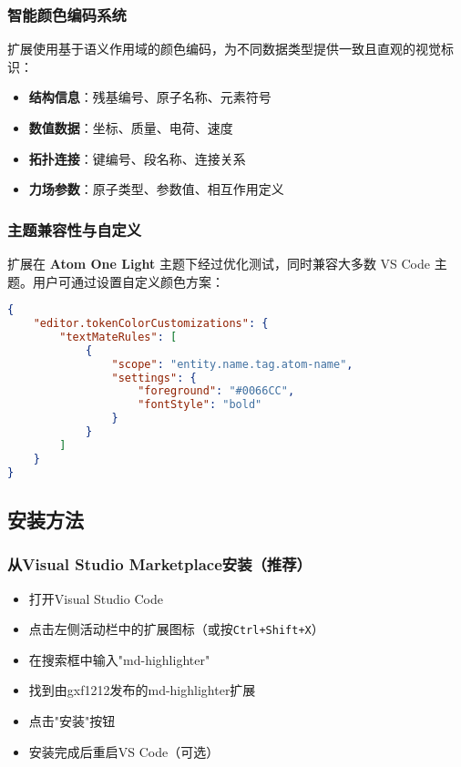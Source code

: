 \subsubsection{智能颜色编码系统}

扩展使用基于语义作用域的颜色编码，为不同数据类型提供一致且直观的视觉标识：

\begin{itemize}
    \item \textbf{结构信息}：残基编号、原子名称、元素符号
    \item \textbf{数值数据}：坐标、质量、电荷、速度
    \item \textbf{拓扑连接}：键编号、段名称、连接关系
    \item \textbf{力场参数}：原子类型、参数值、相互作用定义
\end{itemize}

\subsubsection{主题兼容性与自定义}

扩展在 \textbf{Atom One Light} 主题下经过优化测试，同时兼容大多数 VS Code 主题。用户可通过设置自定义颜色方案：
\newpage

\begin{lstlisting}[style=blockstyle,language=json]
{
    "editor.tokenColorCustomizations": {
        "textMateRules": [
            {
                "scope": "entity.name.tag.atom-name",
                "settings": {
                    "foreground": "#0066CC",
                    "fontStyle": "bold"
                }
            }
        ]
    }
}
\end{lstlisting}

\subsection{安装方法}

\subsubsection{从Visual Studio Marketplace安装（推荐）}

\begin{itemize}
    \item 打开Visual Studio Code
    \item 点击左侧活动栏中的扩展图标（或按\texttt{Ctrl+Shift+X}）
    \item 在搜索框中输入"md-highlighter"
    \item 找到由gxf1212发布的md-highlighter扩展
    \item 点击"安装"按钮
    \item 安装完成后重启VS Code（可选）
\end{itemize}

